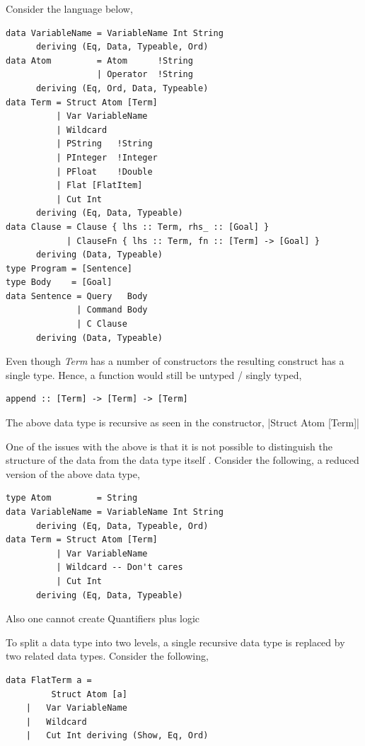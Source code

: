 \documentclass[proposal.tex]{subfiles}
\begin{document}
Consider the language below,

\begin{verbatim}	
data VariableName = VariableName Int String
      deriving (Eq, Data, Typeable, Ord)
data Atom         = Atom      !String
                  | Operator  !String
      deriving (Eq, Ord, Data, Typeable)
data Term = Struct Atom [Term]
          | Var VariableName
          | Wildcard
          | PString   !String
          | PInteger  !Integer
          | PFloat    !Double
          | Flat [FlatItem]
          | Cut Int
      deriving (Eq, Data, Typeable)
data Clause = Clause { lhs :: Term, rhs_ :: [Goal] }
            | ClauseFn { lhs :: Term, fn :: [Term] -> [Goal] }
      deriving (Data, Typeable)
type Program = [Sentence]
type Body    = [Goal]
data Sentence = Query   Body
              | Command Body
              | C Clause
      deriving (Data, Typeable)
\end{verbatim}

Even though \textit{Term} has a number of constructors the resulting construct has a single type. Hence, a function would still be untyped 
/ singly typed,
\begin{verbatim}
append :: [Term] -> [Term] -> [Term]
\end{verbatim} 

The above data type is recursive as seen in the constructor,
|Struct Atom [Term]|

One of the issues with the above is that it is not possible to distinguish the structure of the data from the data type itself 
\cite{sheard2004two}. Consider the following, a reduced version of the above data type,

\begin{verbatim}
type Atom         = String
data VariableName = VariableName Int String
      deriving (Eq, Data, Typeable, Ord)
data Term = Struct Atom [Term]
          | Var VariableName
          | Wildcard -- Don't cares 
          | Cut Int
      deriving (Eq, Data, Typeable)
\end{verbatim}

Also one cannot create Quantifiers plus logic 

To split a data type into two levels, a single recursive data type is replaced by two related data types. Consider the following,
\begin{verbatim}
data FlatTerm a = 
		 Struct Atom [a]
	|	Var VariableName
	|	Wildcard
	|	Cut Int deriving (Show, Eq, Ord)
\end{verbatim}
\end{document}

